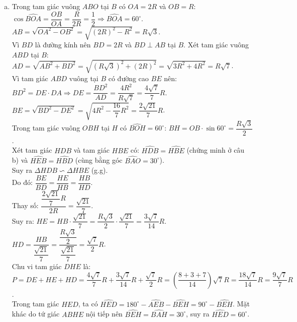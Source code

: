 \begin{bt}
{\begin{enumerate}[a)]
	Mặt khác, trong tứ giác nội tiếp $ABHE$, ta có $\widehat{HBE} = \widehat{EAH}$ (hai góc nội tiếp cùng chắn cung $EH$).\\
	Mà $E, A, D$ thẳng hàng nên $\widehat{EAH} = \widehat{EAB}$.\\
	Từ đó suy ra $\widehat{HDO} = \widehat{HBE}$.
	\item Trong tam giác vuông $ABO$ tại $B$ có $OA = 2R$ và $OB = R$:\\
	$\cos\widehat{BOA} = \dfrac{OB}{OA} = \dfrac{R}{2R} = \dfrac{1}{2} \Rightarrow \widehat{BOA} = 60^\circ$.\\
	$AB = \sqrt{OA^2 - OB^2} = \sqrt{(2R)^2 - R^2} = R\sqrt{3}$.\\
	Vì $BD$ là đường kính nên $BD = 2R$ và $BD \perp AB$ tại $B$. Xét tam giác vuông $ABD$ tại $B$:
	$AD = \sqrt{AB^2 + BD^2} = \sqrt{(R\sqrt{3})^2 + (2R)^2} = \sqrt{3R^2 + 4R^2} = R\sqrt{7}$.\\
	Vì tam giác $ABD$ vuông tại $B$ có đường cao $BE$ nên:
	$BD^2 = DE \cdot DA \Rightarrow DE = \dfrac{BD^2}{AD} = \dfrac{4R^2}{R\sqrt{7}} = \dfrac{4\sqrt{7}}{7}R$.\\
	$BE = \sqrt{BD^2 - DE^2} = \sqrt{4R^2 - \dfrac{16}{7}R^2} = \dfrac{2\sqrt{21}}{7}R$.\\
	Trong tam giác vuông $OBH$ tại $H$ có $\widehat{BOH} = 60^\circ$:
	$BH = OB \cdot \sin 60^\circ = \dfrac{R\sqrt{3}}{2}$.\\
	Xét tam giác $HDB$ và tam giác $HBE$ có:
	$\widehat{HDB} = \widehat{HBE}$ (chứng minh ở câu b) và $\widehat{HEB} = \widehat{HBD}$ (cùng bằng góc $\widehat{BAO} = 30^\circ$).\\
	Suy ra $\Delta HDB \backsim \Delta HBE$ (g.g).\\
	Do đó: $\dfrac{BE}{BD} = \dfrac{HE}{HB} = \dfrac{HB}{HD}$.\\
	Thay số: $\dfrac{\dfrac{2\sqrt{21}}{7}R}{2R} = \dfrac{\sqrt{21}}{7}$.\\
	Suy ra:
	$HE = HB \cdot \dfrac{\sqrt{21}}{7} = \dfrac{R\sqrt{3}}{2} \cdot \dfrac{\sqrt{21}}{7} = \dfrac{3\sqrt{7}}{14}R$.\\
	$HD = \dfrac{HB}{\dfrac{\sqrt{21}}{7}} = \dfrac{\dfrac{R\sqrt{3}}{2}}{\dfrac{\sqrt{21}}{7}} = \dfrac{\sqrt{7}}{2}R$.\\
	Chu vi tam giác $DHE$ là:
	$P = DE + HE + HD = \dfrac{4\sqrt{7}}{7}R + \dfrac{3\sqrt{7}}{14}R + \dfrac{\sqrt{7}}{2}R = \left(\dfrac{8 + 3 + 7}{14}\right)\sqrt{7}R = \dfrac{18\sqrt{7}}{14}R = \dfrac{9\sqrt{7}}{7}R$.\\
	Trong tam giác $HED$, ta có $\widehat{HED} = 180^\circ - \widehat{AEB} - \widehat{BEH} = 90^\circ - \widehat{BEH}$. Mặt khác do tứ giác $ABHE$ nội tiếp nên $\widehat{BEH} = \widehat{BAH} = 30^\circ$, suy ra $\widehat{HED} = 60^\circ$.\\

\end{enumerate}}
\end{bt}
